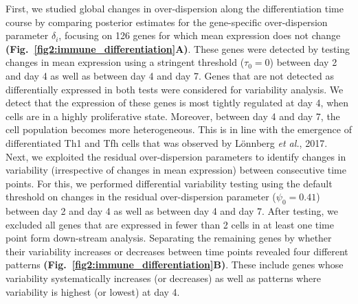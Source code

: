 First, we studied global changes in over-dispersion along the differentiation time course by comparing posterior estimates for the gene-specific over-dispersion parameter $\delta_i$, focusing on 126 genes for which mean expression does not change \textbf{(Fig.~\ref{fig2:immune_differentiation}A)}. These genes were detected by testing changes in mean expression using a stringent threshold ($\tau_0=0$) between day 2 and day 4 as well as between day 4 and day 7. Genes that are not detected as differentially expressed in both tests were considered for variability analysis. We detect that the expression of these genes is most tightly regulated at day 4, when cells are in a highly proliferative state. Moreover, between day 4 and day 7, the cell population becomes more heterogeneous. This is in line with the emergence of differentiated Th1 and Tfh cells that was observed by L\"onnberg \emph{et al.}, 2017. \\

Next, we exploited the residual over-dispersion parameters to identify changes in variability (irrespective of changes in mean expression) between consecutive time points. For this, we performed differential variability testing using the default threshold on changes in the residual over-dispersion parameter ($\psi_0 = 0.41$) between day 2 and day 4 as well as between day 4 and day 7. After testing, we excluded all genes that are expressed in fewer than 2 cells in at least one time point form down-stream analysis. Separating the remaining genes by whether their variability increases or decreases between time points revealed four different patterns \textbf{(Fig.~\ref{fig2:immune_differentiation}B)}. These include genes whose variability systematically increases (or decreases) as well as patterns where variability is highest (or lowest) at day 4. 

\newpage

